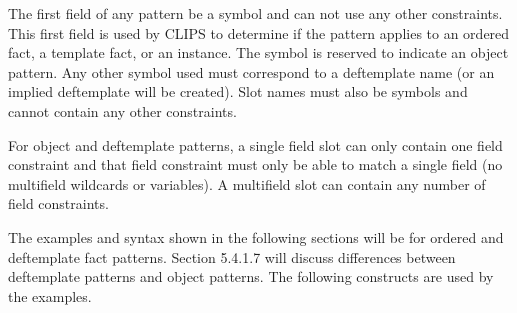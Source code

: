 \documentclass[letterpaper,10pt,english]{sphinxmanual}
\begin{document}
The first field of any pattern  be a symbol and can not use any
other constraints. This first field is used by CLIPS to determine if the
pattern applies to an ordered fact, a template fact, or an instance. The
symbol  is reserved to indicate an object pattern. Any other
symbol used must correspond to a deftemplate name (or an implied
deftemplate will be created). Slot names must also be symbols and cannot
contain any other constraints.

For object and deftemplate patterns, a single field slot can only
contain one field constraint and that field constraint must only be able
to match a single field (no multifield wildcards or variables). A
multifield slot can contain any number of field constraints.

The examples and syntax shown in the following sections will be for
ordered and deftemplate fact patterns. Section 5.4.1.7 will discuss
differences between deftemplate patterns and object patterns. The
following constructs are used by the examples.

\begin{sphinxVerbatim}[commandchars=\\\{\}]
 
     
    
     
     
      

 
   
   
   

 
      
      
      
      
      
\end{sphinxVerbatim}
\end{document}
